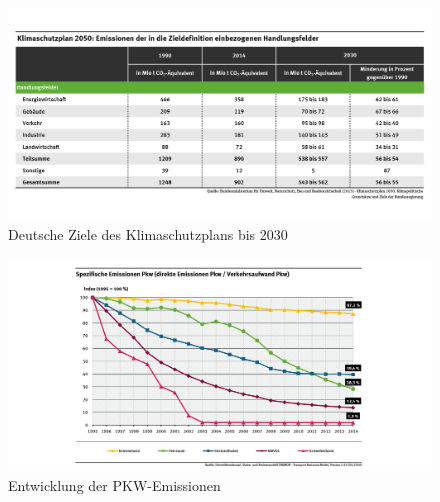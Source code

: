 \begin{figure}[ht]
	\includegraphics[width=\textwidth]{images/klimaschutzplan2050.png}
	\caption{Deutsche Ziele des Klimaschutzplans bis 2030}
	\label{fig4}
\end{figure}

\begin{figure}[ht]
	\includegraphics[width=\textwidth]{images/EntwicklungEmissionsentwicklungPKWs.png}
	\caption{Entwicklung der PKW-Emissionen}
	\label{fig12}
\end{figure}

